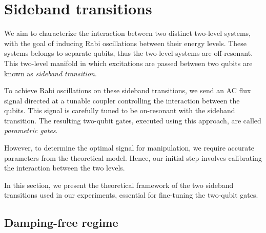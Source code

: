 \section{Sideband transitions}
\label{sec:sideband_transition}


We aim to characterize the interaction between two distinct two-level systems, with the goal of inducing Rabi oscillations between their energy levels.
These systems belongs to separate qubits, thus the two-level systems are off-resonant.
This two-level manifold in which excitations are passed between two qubits are known as \emph{sideband transition}.

To achieve Rabi oscillations on these sideband transitions, we send an AC flux signal directed at a tunable coupler controlling the interaction between the qubits.
This signal is carefully tuned to be on-resonant with the sideband transition.
The resulting two-qubit gates, executed using this approach, are called \emph{parametric gates}.

However, to determine the optimal signal for manipulation, we require accurate parameters from the theoretical model.
Hence, our initial step involves calibrating the interaction between the two levels.

In this section, we present the theoretical framework of the two sideband transitions used in our experiments, essential for fine-tuning the two-qubit gates.

\subsection{Damping-free regime}

